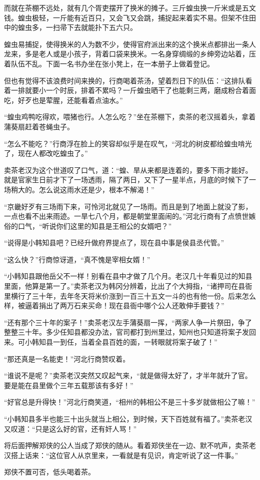 而就在茶棚不远处，就有几个胥吏摆开了换米的摊子。三斤蝗虫换一斤米或是五文钱。蝗虫极轻，一斤能有近百只，又会飞又会跳，捕捉起来着实不易。但架不住田中的蝗虫多，一扫帚下去就能扑下五六只。

蝗虫易捕捉，使得换米的人为数不少，使得官府派出来的这个换米点都排出一条人龙来，多是老人或是小孩子，背着口袋来换米。一名身穿绸缎的乡绅旁边站着，压着队伍不乱。下面一名书办坐在张小凳上，在一本册子上做着登记。

但也有觉得不该浪费时间来换的，行商喝着茶汤，望着烈日下的队伍：“这排队看着一排就要小一个时辰，排着不累吗？一斤蝗虫晒干了也能剩三两，磨成粉合着面吃，好歹也是荤腥，还能看着点油水。”

“蝗虫鸡鸭吃得欢，喂猪也行。人怎么吃？”坐在茶棚下，卖茶的老汉摇着头，拿着蒲葵扇赶着苍蝇虫子。

“怎么不能吃？”行商浮在脸上的笑容却似乎是在叹气，“河北的树皮都给蝗虫啃光了，现在人都改吃蝗虫了。”

卖茶老汉为这个世道叹了口气，道：“蝗、旱从来都是连着的，要多下雨才能好。就是官家生日前才下了一场透雨，隔了两日，又下了一星半点，月底的时候下了一场稍大的。怎么说这雨水还是少，根本不解渴！”

“京畿好歹有三场雨下来，可怜河北就见了一场雨。而且是到了地面上就没了影，一点也看不出来雨迹。一旱七八个月，都是朝堂里面闹的。”河北行商有了点愤世嫉俗的口气，“听说你们这里的知县是王相公的女婿吧？”

“说得是小韩知县吧？已经升做府界提点了，现在县中事是侯县丞代管。”

“这么快？”行商惊讶道，“真不愧是宰相女婿！”

“小韩知县跟他岳父不一样！别看在县中才做了几个月。老汉几十年看见过的知县里面，他算是第一了。”卖茶老汉为韩冈分辨着，比出了个大拇指，“诸押司在县衙里横行了三十年，去年冬天将米价涨到一百三十五文一斗的也有他一份。后来怎么样，被逼着捐出了两万石来买命！现在县衙中哪个公人还敢伸手要钱？”

“还有那个三十年的案子！”卖茶老汉左手蒲葵扇一挥，“两家人争一片祭田，争了整整三十年。多少任知县都没办法，官司都打到州里过，知州也只知道将案子发回来。可小韩知县一到任，当着全县百姓的面，一转眼就将案子破了！”

“那还真是一名能吏！”河北行商赞叹着。

“谁说不是呢？”卖茶老汉突然又叹起气来，“就是做得太好了，才半年就升了官。要是能在县里做个三年五载那该有多好！”

“好官总是升得快！”河北行商笑道，“相州的韩相公不是三十多岁就做相公了嘛！”

“小韩知县多半也能三十出头就当上相公，到时候，天下百姓就有福了。”卖茶老汉又叹道：“只是这么好的官，还有奸人骂！”

将后面押解郑侠的公人当成了郑侠的随从。看着郑侠坐在一边、默不吭声，卖茶老汉搭上话来：“这位官人从京里来，一看就是有见识，肯定听说了这一件事。”

郑侠不置可否，低头喝着茶。


